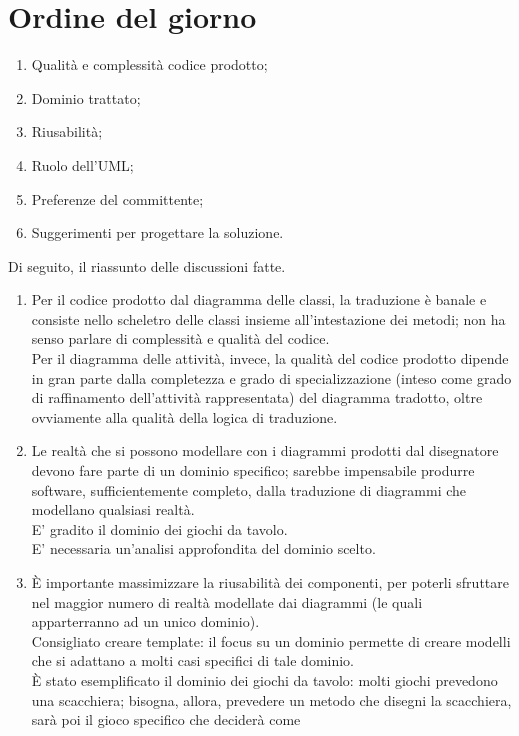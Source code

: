 \documentclass[../AnalisiDeiRequisiti.tex]{subfiles}
\begin{document}
	\section*{Ordine del giorno}
		\begin{enumerate}
			\item Qualità e complessità codice prodotto;
			\item Dominio trattato;
			\item Riusabilità;
			\item Ruolo dell'UML;
			\item Preferenze del committente;
			\item Suggerimenti per progettare la soluzione.
		\end{enumerate}
		Di seguito, il riassunto delle discussioni fatte.
		\begin{enumerate}
			\item Per il codice prodotto dal diagramma delle classi, la traduzione è
			banale e consiste nello scheletro delle classi insieme all'intestazione
			dei metodi; non ha senso parlare di complessità e qualità del codice.\\
			Per il diagramma delle attività, invece, la qualità del codice prodotto
			dipende in gran parte dalla completezza e grado di specializzazione
			(inteso come grado di raffinamento dell'attività rappresentata) del
			diagramma tradotto, oltre ovviamente alla qualità della logica di
			traduzione.
			\item Le realtà che si possono modellare con i diagrammi prodotti dal
			disegnatore devono fare parte di un dominio specifico; sarebbe
			impensabile produrre software, sufficientemente completo, dalla
			traduzione di diagrammi che modellano qualsiasi realtà.\\
			E' gradito il dominio dei giochi da tavolo.\\
			E' necessaria un'analisi approfondita del dominio scelto.
			\item È importante massimizzare la riusabilità dei componenti, per
			poterli sfruttare nel maggior numero di realtà modellate dai diagrammi
			(le quali apparterranno ad un unico dominio).\\
			Consigliato creare template: il focus su un dominio permette di creare
			modelli che si adattano a molti casi specifici di tale dominio.\\
			È stato esemplificato il dominio dei giochi da tavolo: molti giochi
			prevedono una scacchiera; bisogna, allora, prevedere un metodo che
			disegni la scacchiera, sarà poi il gioco specifico che deciderà come

\end{enumerate}
\end{document}
